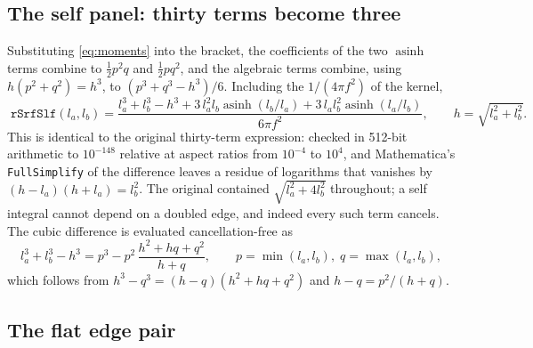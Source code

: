 \documentclass[11pt]{article}
\theoremstyle{remark}
\newcommand{\asinh}{\operatorname{asinh}}
\newcommand{\code}[1]{\texttt{#1}}
\begin{document}
\subsection{The self panel: thirty terms become three}

Substituting \eqref{eq:moments} into the bracket, the coefficients of the two
$\asinh$ terms combine to $\tfrac12 p^2 q$ and $\tfrac12 pq^2$, and the algebraic terms
combine, using $h(p^2+q^2) = h^3$, to $(p^3+q^3-h^3)/6$. Including the $1/(4\pi f^2)$
of the kernel,
\begin{equation}
\boxed{\;
\code{rSrfSlf}(l_a,l_b) = \frac{l_a^3 + l_b^3 - h^3 + 3\,l_a^2 l_b\asinh(l_b/l_a) + 3\,l_a l_b^2\asinh(l_a/l_b)}{6\pi f^2},
\qquad h = \sqrt{l_a^2+l_b^2}.\;}
\label{eq:slf}
\end{equation}
This is identical to the original thirty-term expression: checked in 512-bit
arithmetic to $10^{-148}$ relative at aspect ratios from $10^{-4}$ to $10^{4}$, and
Mathematica's \code{FullSimplify} of the difference leaves a residue of logarithms
that vanishes by $(h-l_a)(h+l_a) = l_b^2$. The original contained
$\sqrt{l_a^2 + 4 l_b^2}$ throughout; a self integral cannot depend on a doubled edge,
and indeed every such term cancels. The cubic difference is evaluated cancellation-free
as
\begin{equation}
l_a^3 + l_b^3 - h^3 = p^3 - p^2\,\frac{h^2 + hq + q^2}{h + q},
\qquad p = \min(l_a,l_b),\; q = \max(l_a,l_b),
\end{equation}
which follows from $h^3 - q^3 = (h-q)(h^2+hq+q^2)$ and $h - q = p^2/(h+q)$.

\subsection{The flat edge pair}
\end{document}
